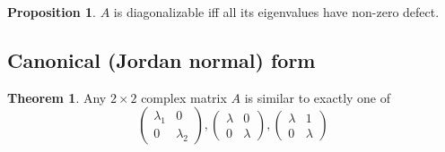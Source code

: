 \documentclass[a4paper]{article}
\theoremstyle{definition}
\newtheorem*{prop}{Proposition}
\newtheorem*{thm}{Theorem}
\begin{document}
\begin{prop}
  $A$ is diagonalizable iff all its eigenvalues have non-zero defect.
\end{prop}
\subsection{Canonical (Jordan normal) form}
\begin{thm}
  Any $2\times 2$ complex matrix $A$ is similar to exactly one of
  \[
  \begin{pmatrix}
    \lambda_1 & 0\\
    0 & \lambda_2
  \end{pmatrix},
  \begin{pmatrix}
    \lambda & 0\\
    0 & \lambda
  \end{pmatrix},
  \begin{pmatrix}
    \lambda & 1\\
    0 & \lambda
  \end{pmatrix}
  \]
\end{thm}
\end{document}
